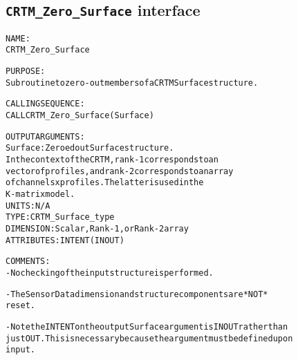 \subsection{\texttt{CRTM\_Zero\_Surface} interface}
  \label{sec:CRTM_Zero_Surface_interface}
  \begin{alltt}
 
  NAME:
        CRTM_Zero_Surface
  
  PURPOSE:
        Subroutine to zero-out members of a CRTM Surface structure.
 
  CALLING SEQUENCE:
        CALL CRTM_Zero_Surface( Surface )
 
  OUTPUT ARGUMENTS:
        Surface:      Zeroed out Surface structure.
                      In the context of the CRTM, rank-1 corresponds to an
                      vector of profiles, and rank-2 corresponds to an array
                      of channels x profiles. The latter is used in the
                      K-matrix model.
                      UNITS:      N/A
                      TYPE:       CRTM_Surface_type
                      DIMENSION:  Scalar, Rank-1, or Rank-2 array
                      ATTRIBUTES: INTENT(IN OUT)
 
  COMMENTS:
        - No checking of the input structure is performed.
 
        - The SensorData dimension and structure components are *NOT*
          reset.
 
        - Note the INTENT on the output Surface argument is IN OUT rather than
          just OUT. This is necessary because the argument must be defined upon
          input.
 
  \end{alltt}
